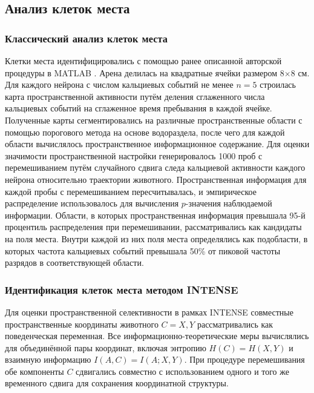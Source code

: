 \subsection{Анализ клеток места}
\label{sec:place_cells_analysis}

\subsubsection{Классический анализ клеток места}
\label{sec:classic_pc_identification}
Клетки места идентифицировались с помощью ранее описанной авторской процедуры в MATLAB
\cite{Plusnin2021}. Арена делилась на квадратные ячейки размером 8$\times$8 см. Для каждого нейрона
с числом кальциевых событий не менее $n=5$ строилась карта пространственной активности путём
деления сглаженного числа кальциевых событий на сглаженное время пребывания в каждой ячейке. Полученные карты сегментировались на различные пространственные области с помощью порогового метода на основе водораздела, после чего для каждой области вычислялось пространственное информационное содержание.
Для оценки значимости пространственной настройки генерировалось 1000 проб с перемешиванием путём
случайного сдвига следа кальциевой активности каждого нейрона относительно траектории животного. Пространственная информация для каждой пробы с перемешиванием пересчитывалась, и эмпирическое распределение использовалось для вычисления $p$-значения наблюдаемой
информации. Области, в которых пространственная информация превышала 95-й процентиль
распределения при перемешивании, рассматривались как кандидаты на поля места. Внутри каждой из них
поля места определялись как подобласти, в которых частота кальциевых событий превышала 50\%
от пиковой частоты разрядов в соответствующей области.


\subsubsection{Идентификация клеток места методом INTENSE}
\label{sec:intense_pc_identification}
Для оценки пространственной селективности в рамках INTENSE совместные пространственные
координаты животного $C={X,Y}$ рассматривались как поведенческая переменная. Все
информационно-теоретические меры вычислялись для объединённой пары координат,
включая энтропию $H(C) = H(X,Y)$ и взаимную информацию $I(A,C) = I(A; X,Y)$.
При процедуре перемешивания обе компоненты $C$ сдвигались совместно с использованием
одного и того же временного сдвига для сохранения координатной структуры.



